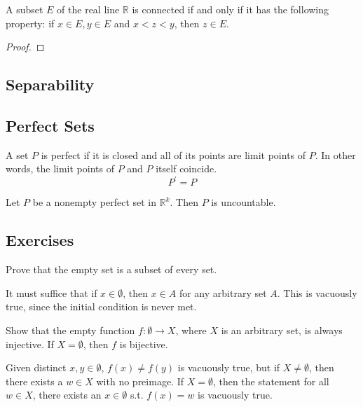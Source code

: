     \begin{theorem}
    A subset $E$ of the real line $\mathbb{R}$ is connected if and only if it has the following property: if $x \in E, y \in E$ and $x < z < y$, then $z \in E$. 
    \end{theorem}
    \begin{proof}

    \end{proof}

  \subsection{Separability}

  \subsection{Perfect Sets}

    \begin{definition}
      A set $P$ is perfect if it is closed and all of its points are limit points of $P$. In other words, the limit points of $P$ and $P$ itself coincide. 
      \begin{equation}
        P^\prime = P
      \end{equation}
    \end{definition}

    \begin{theorem}
      Let $P$ be a nonempty perfect set in $\mathbb{R}^k$. Then $P$ is uncountable. 
    \end{theorem}

  \subsection{Exercises}

    \begin{exercise}[Rudin 2.1]
    Prove that the empty set is a subset of every set. 
    \end{exercise}
    \begin{solution}
    It must suffice that if $x \in \emptyset$, then $x \in A$ for any arbitrary set $A$. This is vacuously true, since the initial condition is never met. 
    \end{solution}

    \begin{exercise}
    Show that the empty function $f: \emptyset \rightarrow X$, where $X$ is an arbitrary set, is always injective. If $X = \emptyset$, then $f$ is bijective. 
    \end{exercise}
    \begin{solution}
    Given distinct $x, y \in \emptyset$, $f(x) \neq f(y)$ is vacuously true, but if $X \neq \emptyset$, then there exists a $w \in X$ with no preimage. If $X = \emptyset$, then the statement for all $w \in X$, there exists an $x \in \emptyset$ s.t. $f(x) = w$ is vacuously true. 
    \end{solution}

